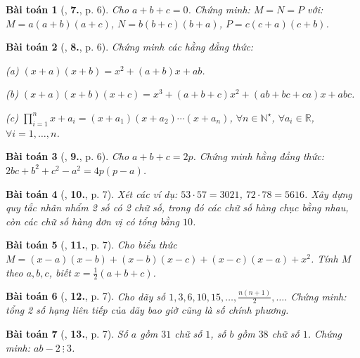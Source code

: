 \documentclass{article}
\numberwithin{equation}{section}
\newtheorem{baitoan}{Bài toán}[section]
\begin{document}
\begin{baitoan}[\cite{Binh_Toan_8_tap_1}, \textbf{7.}, p. 6]
	Cho $a + b + c = 0$. Chứng minh: $M = N = P$ với: $M = a(a + b)(a + c)$, $N = b(b + c)(b + a)$, $P = c(c + a)(c + b)$.
\end{baitoan}

\begin{baitoan}[\cite{Binh_Toan_8_tap_1}, \textbf{8.}, p. 6]
	Chứng minh các hằng đẳng thức:
	\begin{enumerate*}
		\item[(a)] $(x + a)(x + b) = x^2 + (a + b)x + ab$.
		\item[(b)] $(x + a)(x + b)(x + c) = x^3 + (a + b + c)x^2 + (ab + bc + ca)x + abc$.
		\item[(c)] $\prod_{i=1}^n x + a_i = (x + a_1)(x + a_2)\cdots(x + a_n)$, $\forall n\in\mathbb{N}^\star$, $\forall a_i\in\mathbb{R}$, $\forall i = 1,\ldots,n$.
	\end{enumerate*}
\end{baitoan}

\begin{baitoan}[\cite{Binh_Toan_8_tap_1}, \textbf{9.}, p. 6]
	Cho $a + b + c = 2p$. Chứng minh hằng đẳng thức: $2bc + b^2 + c^2 - a^2 = 4p(p - a)$.
\end{baitoan}

\begin{baitoan}[\cite{Binh_Toan_8_tap_1}, \textbf{10.}, p. 7]
	Xét các ví dụ: $53\cdot 57 = 3021$, $72\cdot 78 = 5616$. Xây dựng quy tắc nhân nhẩm 2 số có 2 chữ số, trong đó các chữ số hàng chục bằng nhau, còn các chữ số hàng đơn vị có tổng bằng $10$.
\end{baitoan}

\begin{baitoan}[\cite{Binh_Toan_8_tap_1}, \textbf{11.}, p. 7]
	Cho biểu thức $M = (x - a)(x - b) + (x - b)(x - c) + (x - c)(x - a) + x^2$. Tính $M$ theo $a,b,c$, biết $x = \frac{1}{2}(a + b + c)$.
\end{baitoan}

\begin{baitoan}[\cite{Binh_Toan_8_tap_1}, \textbf{12.}, p. 7]
	Cho dãy số $1,3,6,10,15,\ldots,\frac{n(n + 1)}{2},\ldots$. Chứng minh: tổng 2 số hạng liên tiếp của dãy bao giờ cũng là số chính phương.
\end{baitoan}

\begin{baitoan}[\cite{Binh_Toan_8_tap_1}, \textbf{13.}, p. 7]
	Số $a$ gồm $31$ chữ số $1$, số $b$ gồm $38$ chữ số $1$. Chứng minh: $ab - 2\ \vdots\ 3$.
\end{baitoan}
\end{document}
